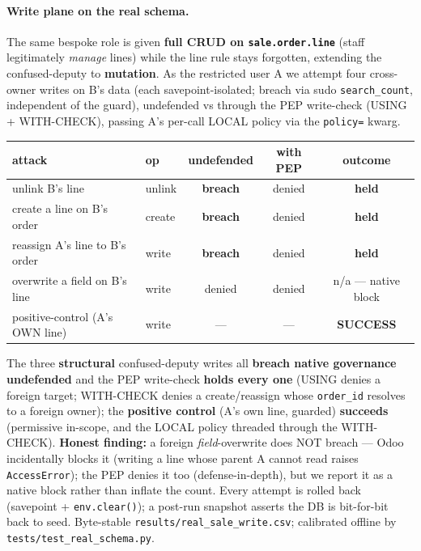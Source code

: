 \documentclass[11pt,a4paper]{article}
\newcommand{\code}[1]{\texttt{#1}}
\begin{document}
\paragraph{Write plane on the real schema.} The same bespoke role is given \textbf{full CRUD on
\code{sale.order.line}} (staff legitimately \emph{manage} lines) while the line rule stays forgotten, extending the
confused-deputy to \textbf{mutation}. As the restricted user A we attempt four cross-owner writes on B's data
(each savepoint-isolated; breach via sudo \code{search\_count}, independent of the guard), undefended vs through
the PEP write-check (USING + WITH-CHECK), passing A's per-call LOCAL policy via the \code{policy=} kwarg.

\begin{center}\small
\begin{tabular}{@{}llccc@{}}
\toprule
attack & op & undefended & with PEP & outcome \\
\midrule
unlink B's line            & unlink & \textbf{breach} & denied & \textbf{held} \\
create a line on B's order & create & \textbf{breach} & denied & \textbf{held} \\
reassign A's line to B's order & write & \textbf{breach} & denied & \textbf{held} \\
overwrite a field on B's line & write & denied & denied & n/a --- native block \\
positive-control (A's OWN line) & write & --- & --- & \textbf{SUCCESS} \\
\bottomrule
\end{tabular}
\end{center}

The three \textbf{structural} confused-deputy writes all \textbf{breach native governance undefended} and the PEP
write-check \textbf{holds every one} (USING denies a foreign target; WITH-CHECK denies a create/reassign whose
\code{order\_id} resolves to a foreign owner); the \textbf{positive control} (A's own line, guarded) \textbf{succeeds}
(permissive in-scope, and the LOCAL policy threaded through the WITH-CHECK). \textbf{Honest finding:} a foreign
\emph{field}-overwrite does NOT breach --- Odoo incidentally blocks it (writing a line whose parent A cannot read
raises \code{AccessError}); the PEP denies it too (defense-in-depth), but we report it as a native block rather than
inflate the count. Every attempt is rolled back (savepoint + \code{env.clear()}); a post-run snapshot asserts the DB
is bit-for-bit back to seed. Byte-stable \code{results/real\_sale\_write.csv}; calibrated offline by
\code{tests/test\_real\_schema.py}.
\end{document}

